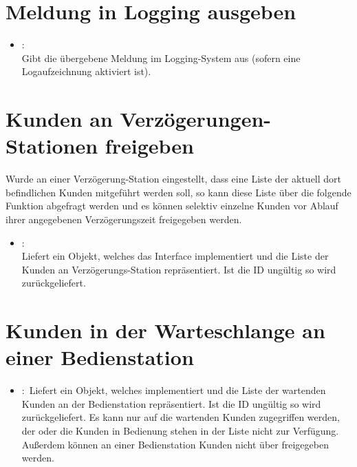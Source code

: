 \section{Meldung in Logging ausgeben}

\begin{itemize}

\item
{}:\\
Gibt die übergebene Meldung im Logging-System aus (sofern eine Logaufzeichnung aktiviert ist).

\end{itemize}

\section{Kunden an Verzögerungen-Stationen freigeben}

Wurde an einer Verzögerung-Station eingestellt, dass eine Liste der aktuell dort befindlichen Kunden
mitgeführt werden soll, so kann diese Liste über die folgende Funktion abgefragt werden und es können
selektiv einzelne Kunden vor Ablauf ihrer angegebenen Verzögerungszeit freigegeben werden.

\begin{itemize}

\item
{}:\\
Liefert ein Objekt, welches das Interface  implementiert und die Liste
der Kunden an Verzögerungs-Station  repräsentiert. Ist die ID ungültig
so wird  zurückgeliefert. 

\end{itemize}

\section{Kunden in der Warteschlange an einer Bedienstation}

\begin{itemize}

  \item
  :\
  Liefert ein Objekt, welches  implementiert und die Liste der wartenden
  Kunden an der Bedienstation \cm{id} repräsentiert. Ist die ID ungültig
  so wird \cm{null} zurückgeliefert. Es kann nur auf die wartenden Kunden zugegriffen werden,
  der oder die Kunden in Bedienung stehen in der Liste nicht zur Verfügung. 
  Außerdem können an einer Bedienstation Kunden nicht über 
  freigegeben werden.
  
\end{itemize}



